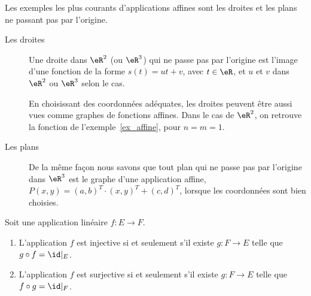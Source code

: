 \begin{example}
	Les exemples les plus courants d'applications affines sont les droites et les plans ne passant pas par l'origine.
	\begin{description}
		\item[Les droites] Une droite dans $\eR^2$ (ou $\eR^3$) qui ne passe pas par l'origine est l'image d'une fonction de la forme $s(t) =u t +v$, avec $t \in \eR$, et $u$ et $v$ dans $\eR^2$ ou $\eR^3$ selon le cas. 

		En choisissant des coordonnées adéquates, les droites peuvent être aussi vues comme graphes de fonctions affines. Dans le cas de $\eR^2$, on retrouve la fonction de l'exemple~\ref{ex_affine}, pour \( n = m = 1 \).

		\item[Les plans]
			De la même façon nous savons que tout plan qui ne passe pas par l'origine dans $\eR^3$ est le graphe d'une application affine, $P(x,y)= (a,b)^T\cdot(x,y)^T+(c,d)^T$, lorsque les coordonnées sont bien choisies.
	\end{description}
\end{example}

\begin{lemma}        \label{LEMooDAACooElDsYb}
    Soit une application linéaire \( f\colon E\to F\).
    \begin{enumerate}
        \item       \label{ITEMooEZEWooZGoqsZ}
            L'application \( f\) est injective si et seulement s'il existe \( g\colon F\to E\) telle que \( g\circ f=\id|_E\).
        \item
            L'application \( f\) est surjective si et seulement s'il existe \( g\colon F\to E\) telle que \( f\circ g=\id|_F\).
    \end{enumerate}
\end{lemma}

